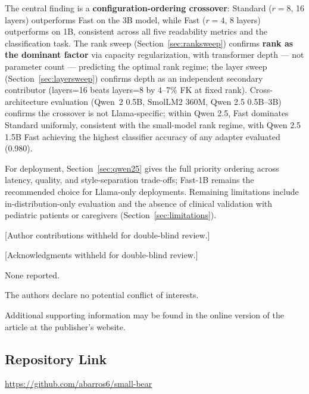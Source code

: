 \documentclass[AMA,Times1COL]{WileyNJDv5} %
\begin{document}
The central finding is a \textbf{configuration-ordering crossover}: Standard ($r=8$, 16 layers) outperforms Fast on the 3B model, while Fast ($r=4$, 8 layers) outperforms on 1B, consistent across all five readability metrics and the classification task. The rank sweep (Section~\ref{sec:ranksweep}) confirms \textbf{rank as the dominant factor} via capacity regularization, with transformer depth --- not parameter count --- predicting the optimal rank regime; the layer sweep (Section~\ref{sec:layersweep}) confirms depth as an independent secondary contributor (layers=16 beats layers=8 by 4--7\% FK at fixed rank). Cross-architecture evaluation (Qwen~2 0.5B, SmolLM2 360M, Qwen 2.5 0.5B--3B) confirms the crossover is not Llama-specific; within Qwen 2.5, Fast dominates Standard uniformly, consistent with the small-model rank regime, with Qwen 2.5 1.5B Fast achieving the highest classifier accuracy of any adapter evaluated (0.980).

For deployment, Section~\ref{sec:qwen25} gives the full priority ordering across latency, quality, and style-separation trade-offs; Fast-1B remains the recommended choice for Llama-only deployments. Remaining limitations include in-distribution-only evaluation and the absence of clinical validation with pediatric patients or caregivers (Section~\ref{sec:limitations}).

{}

[Author contributions withheld for double-blind review.]

[Acknowledgments withheld for double-blind review.]



None reported.


The authors declare no potential conflict of interests.





Additional supporting information may be found in the
online version of the article at the publisher’s website.




\appendix

\subsection{Repository Link}
\noindent \url{https://github.com/abarros6/small-bear}
\end{document}
